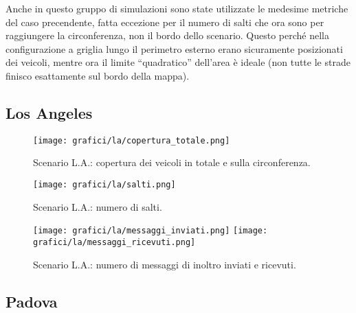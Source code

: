 %
Anche in questo gruppo di simulazioni sono state utilizzate le medesime metriche del caso precendente,
fatta eccezione per il numero di salti che ora sono per raggiungere la circonferenza, non il bordo dello scenario.
Questo perché nella configurazione a griglia lungo il perimetro esterno erano sicuramente posizionati dei veicoli,
mentre ora il limite ``quadratico'' dell'area è ideale (non tutte le strade finisco esattamente sul bordo della mappa).
%
\subsection{Los Angeles}\label{subsec:risultati-la}
%
\begin{figure}[htbp]
	\centering
		\texttt{[image: grafici/la/copertura\_totale.png]}
\caption{Scenario L.A.: copertura dei veicoli in totale e sulla circonferenza.\label{fig:risultati-la-copertura}}
\end{figure}
%
\begin{figure}[htbp]
	\centering
		\texttt{[image: grafici/la/salti.png]}
\caption{Scenario L.A.: numero di salti.\label{fig:risultati-la-salti}}
\end{figure}
%
\begin{figure}[htbp]
	\centering
		\texttt{[image: grafici/la/messaggi\_inviati.png]}
		\texttt{[image: grafici/la/messaggi\_ricevuti.png]}
\caption{Scenario L.A.: numero di messaggi di inoltro inviati e ricevuti.\label{fig:risultati-la-messaggi}}
\end{figure}
\clearpage
%

%
\subsection{Padova}\label{subsec:risultati-pd}

